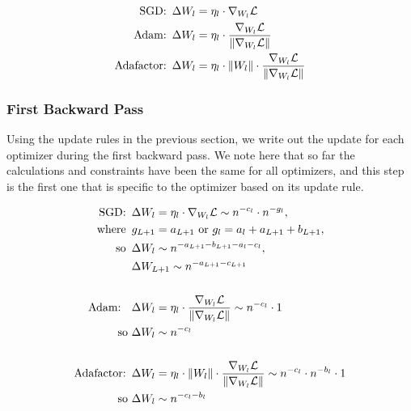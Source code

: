 \documentclass{article}
\theoremstyle{plain}
\theoremstyle{definition}
\theoremstyle{remark}
\newcommand{\loss}{\mathcal{L}}
\newcommand{\hquad}{\hspace{0.5em}}
\begin{document}
\begin{align*}
    \textrm{SGD:}\hquad &\Delta W_l = \eta_l \cdot \nabla_{W_l} \loss\\
    \textrm{Adam:}\hquad &\Delta W_l = \eta_l \cdot \frac{\nabla_{W_l} \loss}{\norm{\nabla_{W_l} \loss}}\\
    \textrm{Adafactor:}\hquad &\Delta W_l = \eta_l \cdot \norm{W_l} \cdot \frac{\nabla_{W_l} \loss}{\norm{\nabla_{W_l} \loss}}\\
\end{align*}

\subsubsection{First Backward Pass}
\label{app:theory_first_backward}
Using the update rules in the previous section, we write out the update for each optimizer during the first backward pass. We note here that so far the calculations and constraints have been the same for all optimizers, and this step is the first one that is specific to the optimizer based on its update rule.

\begin{align*}
\textrm{SGD:} \hquad &\Delta W_l = \eta_l \cdot \nabla_{W_l} \loss \sim n^{-c_l} \cdot n^{-g_l},\\
\textrm{where}\hquad &g_{L+1} = a_{L+1} \textrm{ or } g_l = a_l + a_{L+1} + b_{L+1},\\
\textrm{so}\hquad &\Delta W_l \sim n^{-a_{L+1} - b_{L+1} - a_l - c_l},\\
&\Delta W_{L+1} \sim n^{-a_{L+1} - c_{L+1}}\\ \\
\textrm{Adam: }\hquad &\Delta W_l = \eta_l \cdot \frac{\nabla_{W_l} \mathcal{L}}{\norm{\nabla_{W_l} \mathcal{L}}} \sim n^{-c_l} \cdot 1 \\
  \textrm{so } &\Delta W_l \sim n^{-c_l}\\ \\
\textrm{Adafactor:}\hquad &\Delta W_l = \eta_l \cdot \norm{W_l} \cdot \frac{\nabla_{W_l} \mathcal{L}}{\norm{\nabla_{W_l} \mathcal{L}}} \sim n^{-c_l} \cdot n^{-b_l} \cdot 1\\
    \textrm{so } &\Delta W_l \sim n^{-c_l - b_l}\\
\end{align*}
\end{document}
